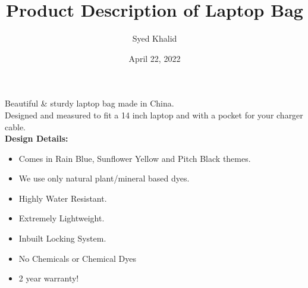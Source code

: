 \documentclass{article}
\title{\textbf{Product Description of Laptop Bag}}
\author{Syed Khalid}
\date{April 22, 2022}
\begin{document}
\maketitle

Beautiful \& sturdy laptop bag made in China.\\ 

Designed and measured to fit a 14 inch laptop and with a pocket for your charger cable.\\

\textbf{Design Details:}
\begin{itemize}
  \item Comes in Rain Blue, Sunflower Yellow and Pitch Black themes.
  \item We use only natural plant/mineral based dyes.
  \item Highly Water Resistant.
  \item Extremely Lightweight. 

    \item   Inbuilt Locking System.
 
  \item  No Chemicals or Chemical Dyes
  \item 2 year warranty!
\end{itemize}
\end{document}
